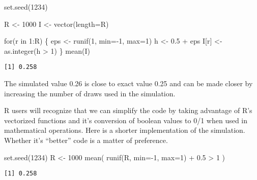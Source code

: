 \documentclass[
  letterpaper,
  DIV=11,
  numbers=noendperiod]{scrreprt}
\newenvironment{Shaded}{\begin{snugshade}}{\end{snugshade}}
\newcommand{\AttributeTok}[1]{\textcolor[rgb]{0.40,0.45,0.13}{#1}}
\newcommand{\ControlFlowTok}[1]{\textcolor[rgb]{0.00,0.23,0.31}{#1}}
\newcommand{\DecValTok}[1]{\textcolor[rgb]{0.68,0.00,0.00}{#1}}
\newcommand{\FloatTok}[1]{\textcolor[rgb]{0.68,0.00,0.00}{#1}}
\newcommand{\FunctionTok}[1]{\textcolor[rgb]{0.28,0.35,0.67}{#1}}
\newcommand{\NormalTok}[1]{\textcolor[rgb]{0.00,0.23,0.31}{#1}}
\newcommand{\OtherTok}[1]{\textcolor[rgb]{0.00,0.23,0.31}{#1}}
\newcommand{\SpecialCharTok}[1]{\textcolor[rgb]{0.37,0.37,0.37}{#1}}
\begin{document}
\begin{Shaded}
\begin{Highlighting}[]
\FunctionTok{set.seed}\NormalTok{(}\DecValTok{1234}\NormalTok{)}

\NormalTok{R }\OtherTok{\textless{}{-}} \DecValTok{1000}
\NormalTok{I }\OtherTok{\textless{}{-}} \FunctionTok{vector}\NormalTok{(}\AttributeTok{length=}\NormalTok{R)}

\ControlFlowTok{for}\NormalTok{(r }\ControlFlowTok{in} \DecValTok{1}\SpecialCharTok{:}\NormalTok{R) \{}
\NormalTok{    eps  }\OtherTok{\textless{}{-}} \FunctionTok{runif}\NormalTok{(}\DecValTok{1}\NormalTok{, }\AttributeTok{min=}\SpecialCharTok{{-}}\DecValTok{1}\NormalTok{, }\AttributeTok{max=}\DecValTok{1}\NormalTok{)}
\NormalTok{    h    }\OtherTok{\textless{}{-}} \FloatTok{0.5} \SpecialCharTok{+}\NormalTok{ eps }
\NormalTok{    I[r] }\OtherTok{\textless{}{-}} \FunctionTok{as.integer}\NormalTok{(h }\SpecialCharTok{\textgreater{}} \DecValTok{1}\NormalTok{)}
\NormalTok{\}}
\FunctionTok{mean}\NormalTok{(I)}
\end{Highlighting}
\end{Shaded}

\begin{verbatim}
[1] 0.258
\end{verbatim}

The simulated value 0.26 is close to exact value 0.25 and can be made
closer by increasing the number of draws used in the simulation.

R users will recognize that we can simplify the code by taking advantage
of R's vectorized functions and it's conversion of boolean values to 0/1
when used in mathematical operations. Here is a shorter implementation
of the simulation. Whether it's ``better'' code is a matter of
preference.

\begin{Shaded}
\begin{Highlighting}[]
\FunctionTok{set.seed}\NormalTok{(}\DecValTok{1234}\NormalTok{)}
\NormalTok{R }\OtherTok{\textless{}{-}} \DecValTok{1000}
\FunctionTok{mean}\NormalTok{( }\FunctionTok{runif}\NormalTok{(R, }\AttributeTok{min=}\SpecialCharTok{{-}}\DecValTok{1}\NormalTok{, }\AttributeTok{max=}\DecValTok{1}\NormalTok{) }\SpecialCharTok{+} \FloatTok{0.5} \SpecialCharTok{\textgreater{}} \DecValTok{1}\NormalTok{ )}
\end{Highlighting}
\end{Shaded}

\begin{verbatim}
[1] 0.258
\end{verbatim}
\end{document}
